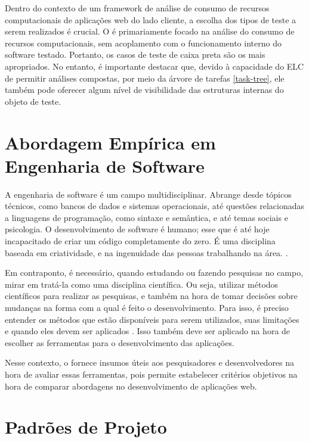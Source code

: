 \documentclass[12pt]{tcc}
\begin{document}
		Dentro do contexto de um framework de análise de consumo de recursos computacionais de aplicações web do lado cliente, a escolha dos tipos de teste a serem realizados é crucial.
		O  é primariamente focado na análise do consumo de recursos computacionais, sem acoplamento com o funcionamento interno do software testado.
		Portanto, os casos de teste de caixa preta são os mais apropriados.
		No entanto, é importante destacar que, devido à capacidade do ELC de permitir análises compostas, por meio da árvore de tarefas \ref{task-tree}, ele também pode oferecer algum nível de visibilidade das estruturas internas do objeto de teste.


		\section{Abordagem Empírica em Engenharia de Software}
		\label{cap:engenharia-de-software-empirica}

		A engenharia de software é um campo multidisciplinar. Abrange desde tópicos técnicos, como bancos de dados e sistemas operacionais, até questões relacionadas a linguagens de programação, como sintaxe e semântica, e até temas sociais e  psicologia. O desenvolvimento de software é humano; esse que é até hoje incapacitado de criar um código completamente do zero. É uma disciplina baseada em criatividade, e na ingenuidade das pessoas trabalhando na área. \citep{wohlin2012experimentation}.

		Em contraponto, é necessário, quando estudando ou fazendo pesquisas no campo, mirar em tratá-la como uma disciplina científica. Ou seja, utilizar métodos científicos para realizar as pesquisas, e também na hora de tomar decisões sobre mudanças na forma com a qual é feito o desenvolvimento. Para isso, é preciso entender os métodos que estão disponíveis para serem utilizados, suas limitações e quando eles devem ser aplicados \citep{wohlin2012experimentation}. Isso também deve ser aplicado na hora de escolher as ferramentas para o desenvolvimento das aplicações.

		Nesse contexto, o  fornece insumos úteis aos pesquisadores e desenvolvedores na hora de avaliar essas ferramentas, pois permite estabelecer critérios objetivos na hora de comparar abordagens no desenvolvimento de aplicações web.

		\section{Padrões de Projeto}
		\label{cap:padroes-de-projeto}
\end{document}

